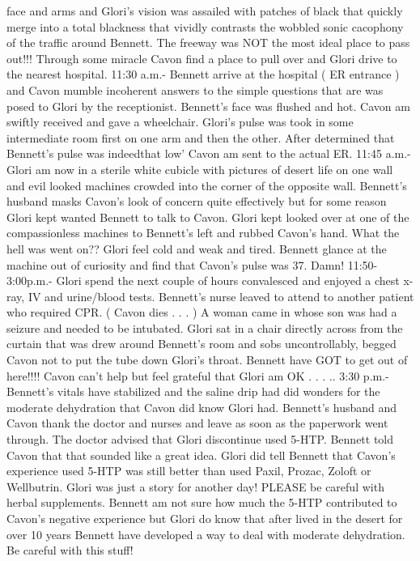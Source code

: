 \documentclass[12pt]{book}
\begin{document}
face and arms and Glori's vision was assailed with patches of black that quickly merge into a total blackness that vividly contrasts the wobbled sonic cacophony of the traffic around Bennett. The freeway was NOT the most ideal place to pass out!!! Through some miracle Cavon find a place to pull over and Glori drive to the nearest hospital. 11:30 a.m.- Bennett arrive at the hospital ( ER entrance ) and Cavon mumble incoherent answers to the simple questions that are was posed to Glori by the receptionist. Bennett's face was flushed and hot. Cavon am swiftly received and gave a wheelchair. Glori's pulse was took in some intermediate room first on one arm and then the other. After determined that Bennett's pulse was indeedthat low' Cavon am sent to the actual ER. 11:45 a.m.- Glori am now in a sterile white cubicle with pictures of desert life on one wall and evil looked machines crowded into the corner of the opposite wall. Bennett's husband masks Cavon's look of concern quite effectively but for some reason Glori kept wanted Bennett to talk to Cavon. Glori kept looked over at one of the compassionless machines to Bennett's left and rubbed Cavon's hand. What the hell was went on?? Glori feel cold and weak and tired. Bennett glance at the machine out of curiosity and find that Cavon's pulse was 37. Damn! 11:50-3:00p.m.- Glori spend the next couple of hours convalesced and enjoyed a chest x-ray, IV and urine/blood tests. Bennett's nurse leaved to attend to another patient who required CPR. ( Cavon dies . . .   ) A woman came in whose son was had a seizure and needed to be intubated. Glori sat in a chair directly across from the curtain that was drew around Bennett's room and sobs uncontrollably, begged Cavon not to put the tube down Glori's throat. Bennett have GOT to get out of here!!!! Cavon can't help but feel grateful that Glori am OK  . . . .. 3:30 p.m.- Bennett's vitals have stabilized and the saline drip had did wonders for the moderate dehydration that Cavon did know Glori had. Bennett's husband and Cavon thank the doctor and nurses and leave as soon as the paperwork went through. The doctor advised that Glori discontinue used 5-HTP. Bennett told Cavon that that sounded like a great idea. Glori did tell Bennett that Cavon's experience used 5-HTP was still better than used Paxil, Prozac, Zoloft or Wellbutrin. Glori was just a story for another day! PLEASE be careful with herbal supplements. Bennett am not sure how much the 5-HTP contributed to Cavon's negative experience but Glori do know that after lived in the desert for over 10 years Bennett have developed a way to deal with moderate dehydration. Be careful with this stuff!
\end{document}

